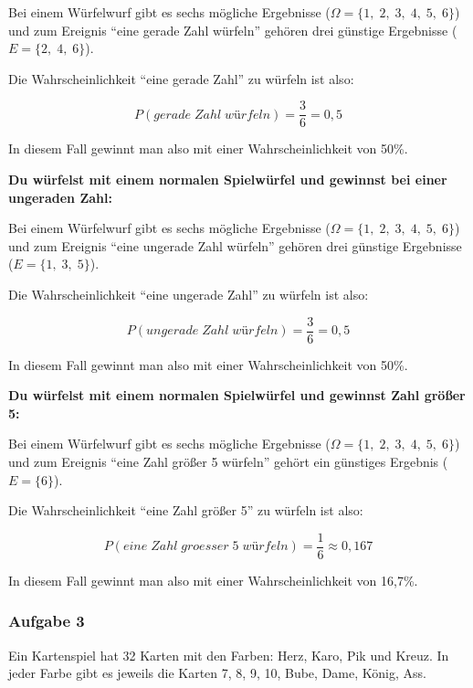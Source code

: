 \documentclass[
  ngerman,
]{book}
\begin{document}
Bei einem Würfelwurf gibt es sechs mögliche Ergebnisse (\(\Omega=\{1,\;2,\;3,\;4,\;5,\;6\}\)) und zum Ereignis ``eine gerade Zahl würfeln'' gehören drei günstige Ergebnisse (\(E=\{2,\;4,\;6\}\)).

Die Wahrscheinlichkeit ``eine gerade Zahl'' zu würfeln ist also:

\[P(gerade\;Zahl\;würfeln)=\frac{3}{6} = 0,5\]

In diesem Fall gewinnt man also mit einer Wahrscheinlichkeit von 50\%.

\textbf{Du würfelst mit einem normalen Spielwürfel und gewinnst bei einer ungeraden Zahl:}

Bei einem Würfelwurf gibt es sechs mögliche Ergebnisse (\(\Omega=\{1,\;2,\;3,\;4,\;5,\;6\}\)) und zum Ereignis ``eine ungerade Zahl würfeln'' gehören drei günstige Ergebnisse (\(E=\{1,\;3,\;5\}\)).

Die Wahrscheinlichkeit ``eine ungerade Zahl'' zu würfeln ist also:

\[P(ungerade\;Zahl\;würfeln)=\frac{3}{6} = 0,5\]

In diesem Fall gewinnt man also mit einer Wahrscheinlichkeit von 50\%.

\textbf{Du würfelst mit einem normalen Spielwürfel und gewinnst Zahl größer 5:}

Bei einem Würfelwurf gibt es sechs mögliche Ergebnisse (\(\Omega=\{1,\;2,\;3,\;4,\;5,\;6\}\)) und zum Ereignis ``eine Zahl größer 5 würfeln'' gehört ein günstiges Ergebnis (\(E=\{6\}\)).

Die Wahrscheinlichkeit ``eine Zahl größer 5'' zu würfeln ist also:

\[P(eine\;Zahl\;groesser\;5\;würfeln)=\frac{1}{6} \approx 0,167\]

In diesem Fall gewinnt man also mit einer Wahrscheinlichkeit von 16,7\%.

\hypertarget{section-93}{%
\subsubsection*{}\label{section-93}}

\hypertarget{aufgabe-3-4}{%
\subsubsection*{Aufgabe 3}\label{aufgabe-3-4}}

Ein Kartenspiel hat 32 Karten mit den Farben: Herz, Karo, Pik und Kreuz. In jeder Farbe gibt es jeweils die Karten 7, 8, 9, 10, Bube, Dame, König, Ass.
\end{document}
